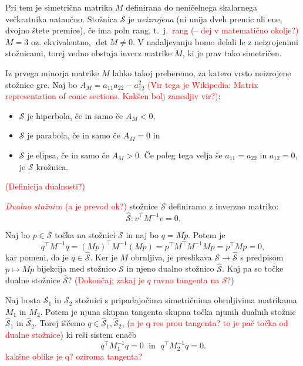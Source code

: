 Pri tem je simetrična matrika $M$ definirana do neničelnega skalarnega večkratnika natančno. Stožnica $\mathcal{S}$ je \emph{neizrojena} (ni unija dveh premic ali ene, dvojno štete premice), če ima poln rang, t.\ j.\ \textcolor{red}{rang (-- dej v matematično okolje?)} $ M = 3$ oz. ekvivalentno, $\det M \neq 0$. V nadaljevanju bomo delali le z neizrojenimi stožnicami, torej vedno obstaja inverz matrike $M$, ki je prav tako simetričen.

Iz prvega minorja matrike $M$ lahko takoj preberemo, za katero vrsto neizrojene stožnice gre. Naj bo $A_M = a_{11}a_{22} - a_{12}^2$ \textcolor{red}{(Vir tega je Wikipedia: Matrix representation of conic sections. Kakšen bolj zanesljiv vir?)}:
\begin{itemize}
    \item $\mathcal{S}$ je hiperbola, če in samo če $A_M < 0$,
    \item $\mathcal{S}$ je parabola, če in samo če $A_M = 0$ in
    \item $\mathcal{S}$ je elipsa, če in samo če $A_M > 0$. Če poleg tega velja še $a_{11} = a_{22}$ in $a_{12} = 0$, je $\mathcal{S}$ krožnica.
\end{itemize}

\textcolor{red}{(Definicija dualnosti?)}

\textcolor{red}{\emph{Dualno stožnico} (a je prevod ok?)} stožnice $\mathcal{S}$ definiramo z inverzno matriko:
\begin{equation*}
    \mathcal{\hat{S}}: v^\intercal M^{-1} v = 0.
\end{equation*}

Naj bo $p \in \mathcal{S}$ točka na stožnici $\mathcal{S}$ in naj bo $q = Mp$. Potem je
 $$q^\intercal M^{-1} q = (Mp)^\intercal M^{-1} (Mp) = p^\intercal M^\intercal M^{-1} M p = p^\intercal M p = 0,$$
 kar pomeni, da je $q \in \mathcal{\hat{S}}$. Ker je $M$ obrnljiva, je preslikava $\mathcal{S} \longrightarrow \mathcal{\hat{S}}$ s predpisom $p \mapsto Mp$ bijekcija med stožnico $\mathcal{S}$ in njeno dualno stožnico $\mathcal{\hat{S}}$. Kaj pa so točke dualne stožnice $\mathcal{\hat{S}}$? (\textcolor{red}{Dokončaj; zakaj je $q$ ravno tangenta na $\mathcal{S}$?})

 Naj bosta $\mathcal{S}_1$ in $\mathcal{S}_2$ stožnici s pripadajočima simetričnima obrnljivima matrikama $M_1$ in $M_2$. Potem je njuna skupna tangenta skupna točka njunih dualnih stožnic $\mathcal{\hat{S}}_1$ in $\mathcal{\hat{S}}_2$. Torej iščemo $q \in \mathcal{\hat{S}}_1, \mathcal{\hat{S}}_2$, (\textcolor{red}{a je q res prou tangenta? to je pač točka od dualne stožnice}) ki reši sistem enačb
 \begin{equation}
    \label{eq:afin_sistem_tangenta_splosen}
    q^\intercal M^{-1}_1 q = 0 \; \text{ in } \; q^\intercal M^{-1}_2 q = 0.
 \end{equation}
 \textcolor{red}{kakšne oblike je q? oziroma tangenta?}


